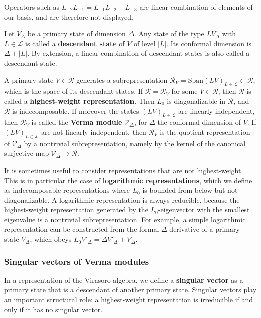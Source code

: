 \documentclass[12pt, a4paper]{article}
\newcommand{\myindex}[1]{\textbf{\boldmath #1}}
\begin{document}
Operators such as
$L_{-2}L_{-1} = L_{-1}L_{-2} -L_{-3}$ are linear combination of elements of our basis, and are therefore not displayed.

Let $V_\Delta$ be a primary state of dimension $\Delta$.
Any state of the type $L V_\Delta$ with $L\in\mathcal{L}$ is called a \myindex{descendant state} of $V$ of level $|L|$. Its conformal dimension is $\Delta+|L|$.
By extension, a linear combination of descendant states is also called a descendant state.

A primary state $V{} \in \mathcal{R}$ generates a subrepresentation $\mathcal{R}_{V{}}= \text{Span}(LV{})_{L\in\mathcal{L}}\subset\mathcal{R}$, which is the space of its descendant states. If $\mathcal{R}=\mathcal{R}_V$ for some $V\in\mathcal{R}$, then $\mathcal{R}$ is called a \myindex{highest-weight representation}. Then $L_0$ is diagonalizable in $\mathcal{R}$, and $\mathcal{R}$ is indecomposable. If moreover the states $(LV{})_{L\in\mathcal{L}}$ are linearly independent, then $\mathcal{R}_{V{}}$ is called the \myindex{Verma module} $\mathcal{V}_\Delta$, for $\Delta$ the conformal dimension of $V$.
If $(LV{})_{L\in\mathcal{L}}$ are not linearly independent, then $\mathcal{R}_{V{}}$ is the quotient representation of $\mathcal{V}_\Delta$ by a nontrivial subrepresentation, namely by the kernel of the canonical surjective map $\mathcal{V}_\Delta\to \mathcal{R}$.

It is sometimes useful to consider representations that are not highest-weight. This is in particular the case of \textbf{logarithmic representations}, which we define as indecomposable representations where $L_0$ is bounded from below but not diagonalizable. A logarithmic representation is always reducible, because the highest-weight representation generated by the $L_0$-eigenvector with the smallest eigenvalue is a nontrivial subrepresentation. For example, a simple logarithmic representation can be constructed from the formal $\Delta$-derivative of a primary state $V_\Delta$, which obeys $L_0 V'_\Delta = \Delta V'_\Delta + V_\Delta$.

\subsubsection{Singular vectors of Verma modules}\label{sec:nvvm}

In a representation of the Virasoro algebra, we define a \myindex{singular vector} as a primary state that is a descendant of another primary state. Singular vectors play an important structural role: a highest-weight representation is irreducible if and only if it has no singular vector.
\end{document}
